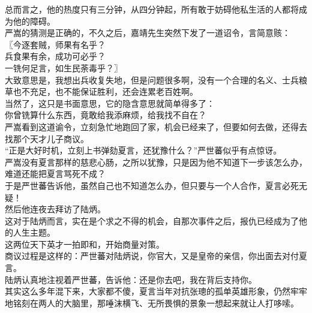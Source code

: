 \begin{multicols}{\theparacolNo}
总而言之，他的热度只有三分钟，从四分钟起，所有敢于妨碍他私生活的人都将成为他的障碍。\\

严嵩的猜测是正确的，不久之后，嘉靖先生突然下发了一道诏令，言简意赅：\\

〖今逐套贼，师果有名乎？\\

兵食果有余，成功可必乎？\\

一铣何足言，如生民荼毒乎？〗\\

大致意思是，我想出兵收复失地，但是问题很多啊，没有一个合理的名义、士兵粮草也不充足，也不能保证胜利，还会连累老百姓啊。\\

当然了，这只是书面意思，它的隐含意思就简单得多了：\\

你曾铣算什么东西，竟敢给我添麻烦，给我找不自在？\\

严嵩看到这道谕令，立刻急忙地跑回了家，机会已经来了，但要如何去做，还得去找那个天才儿子商议。\\

“正是大好时机，立刻上书弹劾夏言，还犹豫什么？”严世蕃似乎有点惊讶。\\

严嵩没有夏言那样的慈悲心肠，之所以犹豫，只是因为他不知道下一步该怎么办，难道还能把夏言骂死不成？\\

于是严世蕃告诉他，虽然自己也不知道怎么办，但只要与一个人合作，夏言必死无疑！\\

然后他连夜去拜访了陆炳。\\

这对于陆炳而言，实在是个求之不得的机会，自那次事件之后，报仇已经成为了他的人生主题。\\

这两位天下英才一拍即和，开始商量对策。\\

商议过程是这样的：严世蕃对陆炳说，你官大，又是皇帝的亲信，你出面去对付夏言。\\

陆炳认真地注视着严世蕃，告诉他：还是你去吧，我在背后支持你。\\

其实这么多年混下来，大家都不傻，夏言当年对抗张璁的孤单英雄形象，仍然牢牢地铭刻在两人的大脑里，那唾沫横飞、无所畏惧的景象一想起来就让人打哆嗦。\\


\end{multicols}
